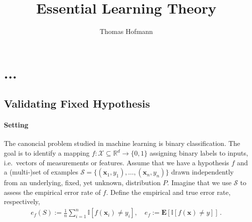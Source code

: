 \documentclass[12pt,a4paper]{article}
\author{Thomas Hofmann}
\title{Essential Learning Theory}
\newcommand{\mc}{\mathcal}
\newcommand{\x}{{\mathbf x}}
\renewcommand{\Re}{\mathbb R}
\newcommand{\E}{\mathbf E}
\begin{document}
\maketitle

\section{...}

\subsection{Validating Fixed Hypothesis}

\paragraph{Setting}
The canoncial problem studied in machine learning is binary classification. The goal is to identify a mapping $f: \mc X \subseteq \Re^d \to \{0,1\}$  assigning binary labels to inputs, i.e.~vectors of measurements or features. Assume that we have a hypothesis $f$ and a (multi-)set of examples $\mc S = \{ (\x_1,y_1), \dots, (\x_n,y_n)\} $ drawn independently from an underlying, fixed, yet unknown, distribution $P$. Imagine that we use $\mc S$ to assess the empirical error rate of $f$. Define the empirical and true error rate, respectively,  
\begin{align}
e_f(S) := \frac 1n \sum_{i=1}^n  \mathbb I[ f(\x_i) \neq y_i], \quad e_f := \E \left[ \mathbb I[ f(\x) \neq y] \right] \,.
\end{align}
\end{document}
